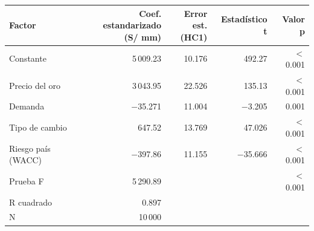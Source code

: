 \begin{tabularx}{\linewidth}{>{\raggedright\arraybackslash}Xrrrr}
\toprule
Factor & \makecell[r]{Coef. estandarizado\\(S/ mm)} & \makecell[r]{Error est.\\(HC1)} & Estadístico t & Valor p \\
\midrule
Constante & 5\,009.23 & 10.176 & 492.27 & $<$0.001 \\
Precio del oro & 3\,043.95 & 22.526 & 135.13 & $<$0.001 \\
Demanda & $-$35.271 & 11.004 & $-$3.205 & 0.001 \\
Tipo de cambio & 647.52 & 13.769 & 47.026 & $<$0.001 \\
Riesgo país (WACC) & $-$397.86 & 11.155 & $-$35.666 & $<$0.001 \\
Prueba F & 5\,290.89 &  &  & $<$0.001 \\
R cuadrado & 0.897 &  &  &  \\
N & 10\,000 &  &  &  \\
\bottomrule
\end{tabularx}
